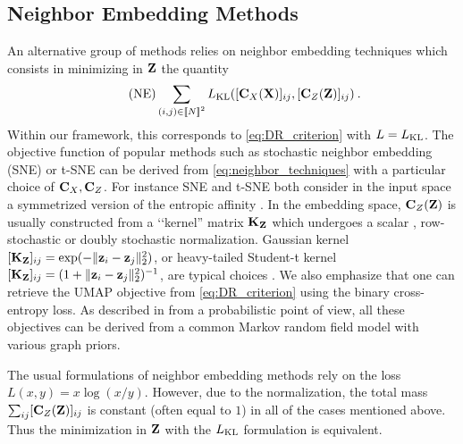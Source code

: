 \subsection{Neighbor Embedding Methods}

An alternative group of methods relies on neighbor embedding techniques which consists in minimizing in ${\mathbf{Z}}$ the quantity
\begin{equation}\tag{NE}
	\label{eq:neighbor_techniques}
	\sum_{(i,j) \in {[\![N]\!]}^2} L_{\operatorname{KL}}([{\mathbf{C}}_{X}({\mathbf{X}})]_{ij}, [{\mathbf{C}}_{Z}({\mathbf{Z}})]_{ij}) \:.
\end{equation}
Within our framework, this corresponds to \cref{eq:DR_criterion} with $L = L_{\operatorname{KL}}$. The objective function of popular methods such as stochastic neighbor embedding (SNE) \citep{hinton2002stochastic} or t-SNE \citep{van2008visualizing} can be derived from \cref{eq:neighbor_techniques} with a particular choice of ${\mathbf{C}}_{X}, {\mathbf{C}}_{Z}$. For instance SNE and t-SNE both consider in the input space a symmetrized version of the entropic affinity \citep{vladymyrov2013entropic,van2023snekhorn}. In the embedding space, ${\mathbf{C}}_Z({\mathbf{Z}})$ is usually constructed from a ‘‘kernel'' matrix ${\mathbf{K}}_{\mathbf{Z}}$ which undergoes a scalar \citep{van2008visualizing}, row-stochastic \citep{hinton2002stochastic} or doubly stochastic \citep{lu2019doubly,van2023snekhorn} normalization. Gaussian kernel $[{\mathbf{K}}_{\mathbf{Z}}]_{ij} = \exp(-\|{\mathbf{z}}_i-{\mathbf{z}}_j\|_2^2)$, or heavy-tailed Student-t kernel $[{\mathbf{K}}_{\mathbf{Z}}]_{ij} = (1+\|{\mathbf{z}}_i-{\mathbf{z}}_j\|_2^2)^{-1}$, are typical choices \citep{van2008visualizing}. We also emphasize that one can retrieve the UMAP objective \citep{mcinnes2018umap} from \cref{eq:DR_criterion} using the binary cross-entropy loss. As described in \citep{van2022probabilistic} from a probabilistic point of view, all these objectives can be derived from a common Markov random field model with various graph priors.
\begin{remark}
The usual formulations of neighbor embedding methods rely on the loss $L(x,y) = x \log(x/y)$. However, due to the normalization, the total mass $\sum_{ij} [{\mathbf{C}}_Z({\mathbf{Z}})]_{ij}$ is constant (often equal to $1$) in all of the cases mentioned above. Thus the minimization in ${\mathbf{Z}}$ with the $L_{\operatorname{KL}}$ formulation is equivalent.
\end{remark}

